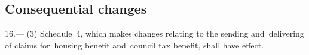\documentclass[12pt,a4paper]{article}
\begin{document}
%
%
%
%
%
%
%
%
%
%
%
%
%

\subsection[16. Consequential changes]{Consequential changes}

16.---%
%
%
(3) Schedule~4, which makes changes relating to the sending and~delivering of claims for~housing benefit and~council tax benefit, shall have effect.
\end{document}
